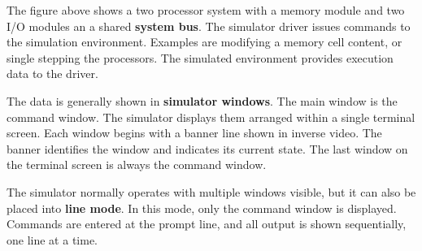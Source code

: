 The figure above shows a two processor system with a memory module and two I/O modules an a shared \textbf{system bus}. The simulator driver issues commands to the simulation environment. Examples are modifying a memory cell content, or single stepping the processors. The simulated environment provides execution data to the driver. 

The data is generally shown in \textbf{simulator windows}. The main window is the command window. The simulator displays them arranged within a single terminal screen. Each window begins with a banner line shown in inverse video. The banner identifies the window and indicates its current state. The last window on the terminal screen is always the command window.

The simulator normally operates with multiple windows visible, but it can also be placed into \textbf{line mode}. In this mode, only the command window is displayed. Commands are entered at the prompt line, and all output is shown sequentially, one line at a time.
